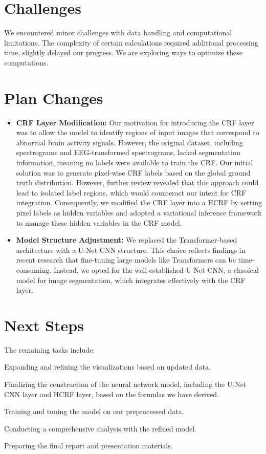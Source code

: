 \documentclass[10pt]{article}
\begin{document}
\section{Challenges}


We encountered minor challenges with data handling and computational
limitations. The complexity of certain calculations required
additional processing time, slightly delayed our progress.
We are exploring ways to optimize these computations.


\section{Plan Changes}


\begin{itemize}
\item \textbf{CRF Layer Modification:}
Our motivation for introducing the CRF layer was to allow the model to
identify regions of input images that correspond to abnormal brain activity
signals. However, the original dataset, including spectrograms and
EEG-transformed spectrograms, lacked segmentation information, meaning no
labels were available to train the CRF.
Our initial solution was to generate pixel-wise CRF labels based on
the global ground truth distribution. However, further review revealed that
this approach could lead to isolated label regions, which would counteract
our intent for CRF integration. Consequently, we modified the CRF layer into
a HCRF by setting pixel labels as hidden variables and adopted a variational
inference framework to manage these hidden variables in the CRF model.
\item \textbf{Model Structure Adjustment:}
We replaced the Transformer-based architecture with a U-Net CNN structure.
This choice reflects findings in recent research that fine-tuning large models
like Transformers can be time-consuming. Instead, we opted for the
well-established U-Net CNN, a classical model for image segmentation,
which integrates effectively with the CRF layer.
\end{itemize}


\section{Next Steps}


The remaining tasks include:
\begin{enumerate*}[label = (\roman*)]
\item Expanding and refining the visualizations based on updated data.
\item Finalizing the construction of the neural network model, including
the U-Net CNN layer and HCRF layer, based on the formulas we have derived.
\item Training and tuning the model on our preprocessed data.
\item Conducting a comprehensive analysis with the refined model.
\item Preparing the final report and presentation materials.
\end{enumerate*}
\end{document}
